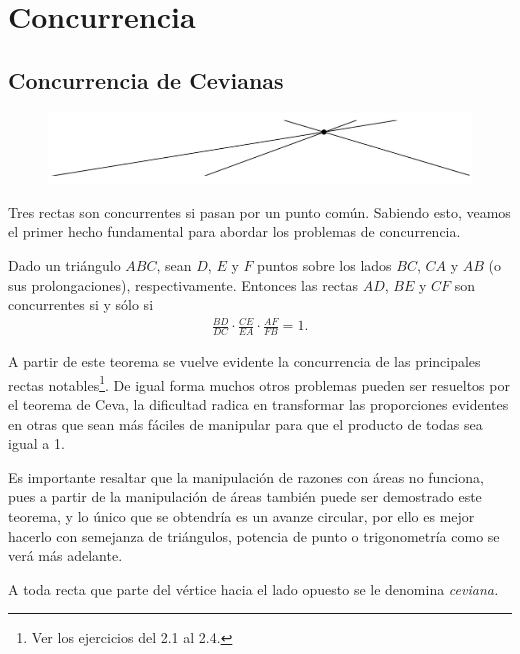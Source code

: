 \newpage
\section{Concurrencia}


\subsection{Concurrencia de Cevianas}


\begin{figure}[htb]
    \centering
    \includegraphics[width=14cm]{images/concurrence-1}
\end{figure}

Tres rectas son concurrentes si pasan por un punto común.
Sabiendo esto, veamos el primer hecho fundamental para abordar los problemas de concurrencia.

\begin{section-theorem.tcb}
    Dado un triángulo $ABC$, sean $D$, $E$ y $F$ puntos sobre los lados $BC$, $CA$ y $AB$ (o sus prolongaciones), respectivamente.
    Entonces las rectas $AD$, $BE$ y $CF$ son concurrentes si y sólo si
    \begin{gather*}
        \frac{BD}{DC} \cdot \frac{CE}{EA} \cdot \frac{AF}{FB} = 1.
    \end{gather*}
\end{section-theorem.tcb}

A partir de este teorema se vuelve evidente la concurrencia de las principales rectas notables\footnote{Ver los ejercicios del 2.1 al 2.4.}.
De igual forma muchos otros problemas pueden ser resueltos por el teorema de Ceva, la dificultad radica en transformar las proporciones evidentes en otras que sean más fáciles de manipular para que el producto de todas sea igual a 1.

Es importante resaltar que la manipulación de razones con áreas no funciona, pues a partir de la manipulación de áreas también puede ser demostrado este teorema, y lo único que se obtendría es un avanze circular, por ello es mejor hacerlo con semejanza de triángulos, potencia de punto o trigonometría como se verá más adelante.

\begin{section-definition.tcb}
    A toda recta que parte del vértice hacia el lado opuesto se le denomina \textit{ceviana.}
\end{section-definition.tcb}

